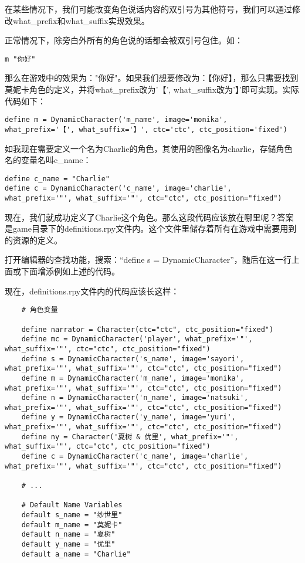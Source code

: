 \begin{ExtraKnowledge}
    在某些情况下，我们可能改变角色说话内容的双引号为其他符号，我们可以通过修改what\_prefix和what\_suffix实现效果。

    正常情况下，除旁白外所有的角色说的话都会被双引号包住。如：
    \begin{lstlisting}
m "你好"
    \end{lstlisting}

    那么在游戏中的效果为："你好"。如果我们想要修改为：【你好】，那么只需要找到莫妮卡角色的定义，并将what\_prefix改为'【', what\_suffix改为'】'即可实现。实际代码如下：
    \begin{lstlisting}
define m = DynamicCharacter('m_name', image='monika', what_prefix='【', what_suffix='】', ctc='ctc', ctc_position='fixed')
    \end{lstlisting}
\end{ExtraKnowledge}

如我现在需要定义一个名为Charlie的角色，其使用的图像名为charlie，存储角色名的变量名叫c\_name：
\begin{lstlisting}
define c_name = "Charlie"
define c = DynamicCharacter('c_name', image='charlie', what_prefix='"', what_suffix='"', ctc="ctc", ctc_position="fixed")
\end{lstlisting}

现在，我们就成功定义了Charlie这个角色。那么这段代码应该放在哪里呢？答案是game目录下的definitions.rpy文件内。这个文件里储存着所有在游戏中需要用到的资源的定义。

打开编辑器的查找功能，搜索：“define s = DynamicCharacter”，随后在这一行上面或下面增添例如上述的代码。

现在，definitions.rpy文件内的代码应该长这样：
\begin{lstlisting}
    # 角色变量

    define narrator = Character(ctc="ctc", ctc_position="fixed")
    define mc = DynamicCharacter('player', what_prefix='"', what_suffix='"', ctc="ctc", ctc_position="fixed")
    define s = DynamicCharacter('s_name', image='sayori', what_prefix='"', what_suffix='"', ctc="ctc", ctc_position="fixed")
    define m = DynamicCharacter('m_name', image='monika', what_prefix='"', what_suffix='"', ctc="ctc", ctc_position="fixed")
    define n = DynamicCharacter('n_name', image='natsuki', what_prefix='"', what_suffix='"', ctc="ctc", ctc_position="fixed")
    define y = DynamicCharacter('y_name', image='yuri', what_prefix='"', what_suffix='"', ctc="ctc", ctc_position="fixed")
    define ny = Character('夏树 & 优里', what_prefix='"', what_suffix='"', ctc="ctc", ctc_position="fixed")
    define c = DynamicCharacter('c_name', image='charlie', what_prefix='"', what_suffix='"', ctc="ctc", ctc_position="fixed")
    
    # ...
    
    # Default Name Variables
    default s_name = "纱世里"
    default m_name = "莫妮卡"
    default n_name = "夏树"
    default y_name = "优里"
    default a_name = "Charlie"
    
    
\end{lstlisting}

